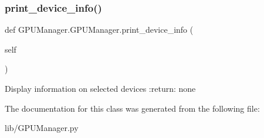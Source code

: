\subsubsection{print\+\_\+device\+\_\+info()}
{\footnotesize\ttfamily def G\+P\+U\+Manager.\+G\+P\+U\+Manager.\+print\+\_\+device\+\_\+info (\begin{DoxyParamCaption}\item[{}]{self }\end{DoxyParamCaption})}

\begin{DoxyVerb}Display information on selected devices
:return:  none
\end{DoxyVerb}
 

The documentation for this class was generated from the following file\+:\begin{DoxyCompactItemize}
\item 
lib/G\+P\+U\+Manager.\+py\end{DoxyCompactItemize}
